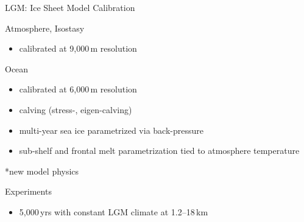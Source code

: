 \documentclass[hide notes,intlimits]{beamer}
\begin{document}
\begin{frame}{LGM: Ice Sheet Model Calibration}
  \begin{block}{Atmosphere, Isostasy}
    \begin{itemize}
    \item calibrated at 9,000\,m resolution
    \end{itemize}
  \end{block}
  \begin{block}{Ocean}
    \begin{itemize}
    \item calibrated at 6,000\,m resolution
    \item calving (\alert{stress}-, eigen-calving)
    \item \alert{multi-year sea ice parametrized via back-pressure}
    \item \alert{sub-shelf and frontal melt} parametrization tied to atmosphere temperature
    \end{itemize}
  \end{block}
    \alert{*new model physics}
  \begin{block}{Experiments}
    \begin{itemize}
    \item 5,000\,yrs with constant LGM climate at 1.2--18\,km
    \end{itemize}
  \end{block}
\end{frame}
\end{document}
